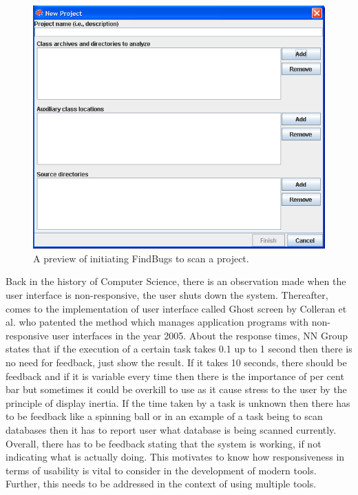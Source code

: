\begin{figure}[hbt!]
	\centering
	\includegraphics[width=\linewidth]{figures/findbugs-scan}
	\caption{A preview of initiating FindBugs to scan a project.}
	\label{fig:findbugs-scan}
\end{figure}

Back in the history of Computer Science, there is an observation made when the user interface is non-responsive, the user shuts down the system. Thereafter, comes to the implementation of user interface called Ghost screen by Colleran et al. \cite{colleran} who patented the method which manages application programs with non-responsive user interfaces in the year 2005. About the response times, NN Group \cite{nn} states that if the execution of a certain task takes 0.1 up to 1 second then there is no need for feedback, just show the result. If it takes 10 seconds, there should be feedback and if it is variable every time then there is the importance of per cent bar \cite{Borman} but sometimes it could be overkill to use as it cause stress to the user by the principle of display inertia. If the time taken by a task is unknown then there has to be feedback like a spinning ball or in an example of a task being to scan databases then it has to report user what database is being scanned currently. Overall, there has to be feedback stating that the system is working, if not indicating what is actually doing. This motivates to know how responsiveness in terms of usability is vital to consider in the development of modern tools. Further, this needs to be addressed in the context of using multiple tools.\\ \\


